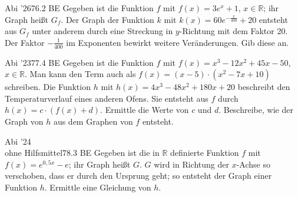 \documentclass[11pt]{article}
\begin{document}
\pfgruppe{}
\begin{pfaufg}{Abi ’26}{76.}{2 BE}
Gegeben ist die Funktion $f$ mit $f(x) = 3e^x + 1$, $x \in \mathbb{R}$; ihr Graph heißt $G_f$. Der Graph der Funktion $k$ mit $k(x) = 60e^{-\tfrac{x}{400}} + 20$ entsteht aus $G_f$ unter anderem durch eine Streckung in $y$-Richtung mit dem Faktor 20. Der Faktor $-\tfrac{1}{400}$ im Exponenten bewirkt weitere Veränderungen. Gib diese an.
\par\smallskip\noindent {}\par
{}
\end{pfaufg}
\begin{pfaufg}{Abi ’23}{77.}{4 BE}
Gegeben ist die Funktion $f$ mit $f(x) = x^3 - 12x^2 + 45x - 50$, $x \in \mathbb{R}$. Man kann den Term auch als $f(x) = (x - 5)\cdot(x^2 - 7x + 10)$ schreiben. Die Funktion $h$ mit $h(x) = 4x^3 - 48x^2 + 180x + 20$ beschreibt den Temperaturverlauf eines anderen Ofens. Sie entsteht aus $f$ durch $h(x) = c\cdot(f(x) + d)$. Ermittle die Werte von $c$ und $d$. Beschreibe, wie der Graph von $h$ aus dem Graphen von $f$ entsteht.
\end{pfaufg}
\pfgruppe{}
\begin{pfaufg}{Abi ’24\\ohne Hilfsmittel}{78.}{3 BE}
Gegeben ist die in $\mathbb{R}$ definierte Funktion $f$ mit $f(x) = e^{0{,}5x} - e$; ihr Graph heißt $G$. $G$ wird in Richtung der $x$-Achse so verschoben, dass er durch den Ursprung geht; so entsteht der Graph einer Funktion $h$. Ermittle eine Gleichung von $h$.
\end{pfaufg}
\end{document}
